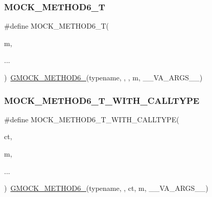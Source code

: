 \mbox{\label{googletest-master_2googlemock_2include_2gmock_2gmock-generated-function-mockers_8h_a0d16357a0043d36b167a1c42ef33f672}} 
\subsubsection{\texorpdfstring{MOCK\_METHOD6\_T}{MOCK\_METHOD6\_T}}
{\footnotesize\ttfamily \#define M\+O\+C\+K\+\_\+\+M\+E\+T\+H\+O\+D6\+\_\+T(\begin{DoxyParamCaption}\item[{}]{m,  }\item[{}]{... }\end{DoxyParamCaption})~\mbox{\hyperlink{_obj__test_2lib_2googletest-release-1_88_81_2googlemock_2include_2gmock_2gmock-generated-function-mockers_8h_ad0ca7f6973a076d0af4c953f8ed91842}{G\+M\+O\+C\+K\+\_\+\+M\+E\+T\+H\+O\+D6\+\_\+}}(typename, , , m, \+\_\+\+\_\+\+V\+A\+\_\+\+A\+R\+G\+S\+\_\+\+\_\+)}

\mbox{\label{googletest-master_2googlemock_2include_2gmock_2gmock-generated-function-mockers_8h_a0dfe65f974c2b6d60cac3114489b4527}} 
\subsubsection{\texorpdfstring{MOCK\_METHOD6\_T\_WITH\_CALLTYPE}{MOCK\_METHOD6\_T\_WITH\_CALLTYPE}}
{\footnotesize\ttfamily \#define M\+O\+C\+K\+\_\+\+M\+E\+T\+H\+O\+D6\+\_\+\+T\+\_\+\+W\+I\+T\+H\+\_\+\+C\+A\+L\+L\+T\+Y\+PE(\begin{DoxyParamCaption}\item[{}]{ct,  }\item[{}]{m,  }\item[{}]{... }\end{DoxyParamCaption})~\mbox{\hyperlink{_obj__test_2lib_2googletest-release-1_88_81_2googlemock_2include_2gmock_2gmock-generated-function-mockers_8h_ad0ca7f6973a076d0af4c953f8ed91842}{G\+M\+O\+C\+K\+\_\+\+M\+E\+T\+H\+O\+D6\+\_\+}}(typename, , ct, m, \+\_\+\+\_\+\+V\+A\+\_\+\+A\+R\+G\+S\+\_\+\+\_\+)}


